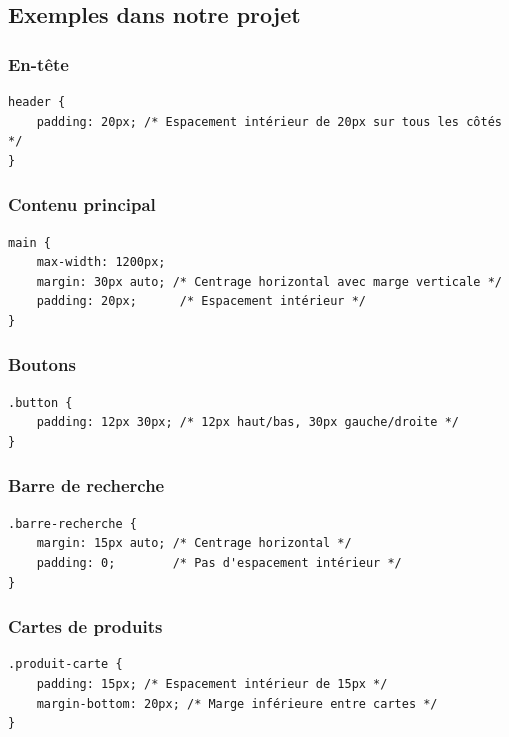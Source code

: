 \documentclass[12pt,a4paper]{article}
\begin{document}
\subsection{Exemples dans notre projet}

\subsubsection{En-tête}

\begin{lstlisting}[style=CSS]
header {
    padding: 20px; /* Espacement intérieur de 20px sur tous les côtés */
}
\end{lstlisting}

\subsubsection{Contenu principal}

\begin{lstlisting}[style=CSS]
main {
    max-width: 1200px;
    margin: 30px auto; /* Centrage horizontal avec marge verticale */
    padding: 20px;      /* Espacement intérieur */
}
\end{lstlisting}

\subsubsection{Boutons}

\begin{lstlisting}[style=CSS]
.button {
    padding: 12px 30px; /* 12px haut/bas, 30px gauche/droite */
}
\end{lstlisting}

\subsubsection{Barre de recherche}

\begin{lstlisting}[style=CSS]
.barre-recherche {
    margin: 15px auto; /* Centrage horizontal */
    padding: 0;        /* Pas d'espacement intérieur */
}
\end{lstlisting}

\subsubsection{Cartes de produits}

\begin{lstlisting}[style=CSS]
.produit-carte {
    padding: 15px; /* Espacement intérieur de 15px */
    margin-bottom: 20px; /* Marge inférieure entre cartes */
}
\end{lstlisting}
\end{document}
